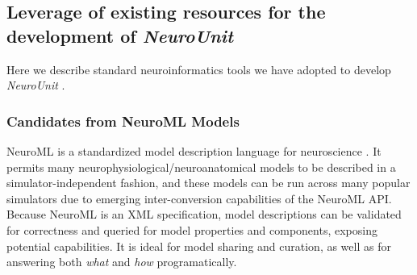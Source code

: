 \documentclass[11pt,letterpaper]{article}
\begin{document}
\subsection{Leverage of existing resources for the development of \textit{NeuroUnit}}
Here we describe standard neuroinformatics tools we have adopted to develop \textit{NeuroUnit} \cite{neurounit_url}.  

\subsubsection{Candidates from NeuroML Models}\label{sec:neuroml_candidates}
NeuroML is a standardized model description language for neuroscience \cite{gleeson_neuroml:_2010}. It permits many neurophysiological/neuroanatomical models to be described in a simulator-independent fashion, and these models can be run across many popular simulators due to emerging inter-conversion capabilities of the NeuroML API.  Because NeuroML is an XML specification, model descriptions can be validated for correctness and queried for model properties and components, exposing potential capabilities.  It is ideal for model sharing and curation, as well as for answering both \textit{what} and \textit{how} programatically.  
\end{document}
